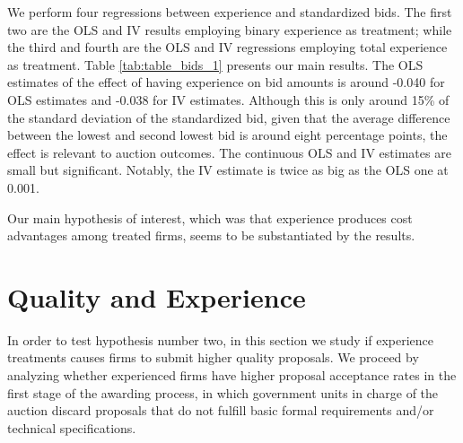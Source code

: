 We perform four regressions between experience and standardized bids. The first two are the OLS and IV results employing binary experience as treatment; while the third and fourth are the OLS and IV regressions employing total experience as treatment. Table \ref{tab:table_bids_1} presents our main results. The OLS estimates of the effect of having experience on bid amounts is around -0.040 for OLS estimates and -0.038 for IV estimates. Although this is only around 15\% of the standard deviation of the standardized bid, given that the average difference between the lowest and second lowest bid is around eight percentage points, the effect is relevant to auction outcomes. The continuous OLS and IV estimates are small but significant. Notably, the IV estimate is twice as big as the OLS one at 0.001.



Our main hypothesis of interest, which was that experience produces cost advantages among treated firms, seems to be substantiated by the results. %


\section{Quality and Experience}
\label{section:qualityexp}
In order to test hypothesis number two, in this section we study if experience treatments causes firms to submit higher quality proposals. We proceed by analyzing whether experienced firms have higher proposal acceptance rates in the first stage of the awarding process, in which government units in charge of the auction discard proposals that do not fulfill basic formal requirements and/or technical specifications.


